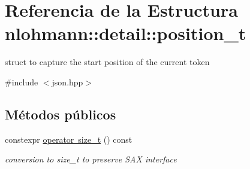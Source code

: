 \hypertarget{structnlohmann_1_1detail_1_1position__t}{}\section{Referencia de la Estructura nlohmann\+:\+:detail\+:\+:position\+\_\+t}
\label{structnlohmann_1_1detail_1_1position__t}


struct to capture the start position of the current token  




{\ttfamily \#include $<$json.\+hpp$>$}

\subsection*{Métodos públicos}
\begin{DoxyCompactItemize}
\item 
\mbox{\label{structnlohmann_1_1detail_1_1position__t_ac9ad1e0f143f162e2e0c979cd678d683}} 
constexpr \mbox{\hyperlink{structnlohmann_1_1detail_1_1position__t_ac9ad1e0f143f162e2e0c979cd678d683}{operator size\+\_\+t}} () const
\begin{DoxyCompactList}\small\item\em conversion to size\+\_\+t to preserve S\+AX interface \end{DoxyCompactList}\end{DoxyCompactItemize}
